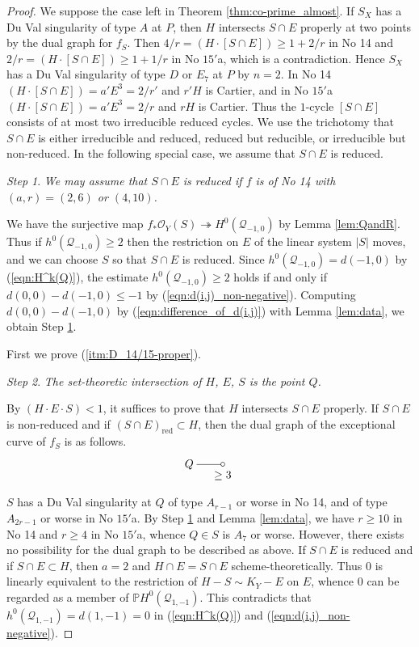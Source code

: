 \documentclass[a4paper,11pt]{amsart}
\theoremstyle{definition}
\theoremstyle{remark}
\newtheorem{step}{Step}
\numberwithin{equation}{section}
\newcommand{\bP}{{\mathbb P}}
\newcommand{\cO}{{\mathcal O}}
\newcommand{\cQ}{{\mathcal Q}}
\newcommand{\red}{\mathrm{red}}
\newcommand{\system}[1]{\left|{#1}\right|}
\begin{document}
\begin{proof}
We suppose the case left in Theorem \ref{thm:co-prime_almost}.
If $S_X$ has a Du Val singularity of type $A$ at $P$,
then $H$ intersects $S \cap E$ properly at two points
by the dual graph for $f_S$.
Then $4/r=(H \cdot [S \cap E])\ge1+2/r$ in No 14
and $2/r=(H \cdot [S \cap E])\ge1+1/r$ in No $\textrm{15}'$a,
which is a contradiction.
Hence $S_X$ has a Du Val singularity of type $D$ or $E_7$ at $P$ by $n=2$.
In No 14 $(H \cdot [S \cap E])=a'E^3=2/r'$ and $r'H$ is Cartier,
and in No $\textrm{15}'$a $(H \cdot [S \cap E])=a'E^3=2/r$ and $rH$ is Cartier.
Thus
the $1$-cycle $[S \cap E]$ consists of at most two irreducible reduced cycles.
We use the trichotomy that
$S \cap E$ is either irreducible and reduced,
reduced but reducible, or irreducible but non-reduced.
In the following special case,
we assume that $S \cap E$ is reduced.

\begin{step}\label{stp:14/15-1}
\itshape
We may assume that $S \cap E$ is reduced if
$f$ is of No 14 with $(a,r)=(2,6)$ or $(4,10)$.
\end{step}

We have the surjective map $f_*\cO_Y(S) \twoheadrightarrow H^0(\cQ_{-1,0})$
by Lemma \ref{lem:QandR}.
Thus if $h^0(\cQ_{-1,0}) \ge 2$ then
the restriction on $E$ of the linear system $\system{S}$ moves,
and we can choose $S$ so that $S \cap E$ is reduced.
Since $h^0(\cQ_{-1,0})=d(-1,0)$ by (\ref{eqn:H^k(Q)}),
the estimate $h^0(\cQ_{-1,0}) \ge 2$ holds if and only if
$d(0,0)-d(-1,0) \le -1$ by (\ref{eqn:d(i,j)_non-negative}).
Computing $d(0,0)-d(-1,0)$
by (\ref{eqn:difference_of_d(i,j)}) with Lemma \ref{lem:data},
we obtain Step \ref{stp:14/15-1}.

First we prove (\ref{itm:D_14/15-proper}).

\begin{step}\label{stp:14/15-2}
\itshape
The set-theoretic intersection of $H$, $E$, $S$ is the point $Q$.
\end{step}

By $(H \cdot E \cdot S)<1$,
it suffices to prove that $H$ intersects $S \cap E$ properly.
If $S \cap E$ is non-reduced and if $(S \cap E)_\red \subset H$,
then the dual graph of the exceptional curve of $f_S$ is as follows.
\begin{align*}
\xymatrix@!0@=30pt{
Q \ar@{-}[r]_>*+{\ \ge3} &
*=<3.5pt>{\circ}
}
\end{align*}
$S$ has a Du Val singularity at $Q$ of type $A_{r-1}$ or worse in No 14,
and of type $A_{2r-1}$ or worse in No $\textrm{15}'$a.
By Step \ref{stp:14/15-1} and Lemma \ref{lem:data},
we have $r\ge10$ in No 14 and $r\ge4$ in No $\textrm{15}'$a,
whence $Q \in S$ is $A_7$ or worse.
However,
there exists no possibility for the dual graph to be described as above.
If $S \cap E$ is reduced and if $S \cap E \subset H$,
then $a=2$ and $H \cap E=S \cap E$ scheme-theoretically.
Thus $0$ is linearly equivalent to the restriction of $H-S \sim K_Y-E$ on $E$,
whence $0$ can be regarded as a member of $\bP H^0(\cQ_{1,-1})$.
This contradicts that $h^0(\cQ_{1,-1})=d(1,-1)=0$
in (\ref{eqn:H^k(Q)}) and (\ref{eqn:d(i,j)_non-negative}).


\end{proof}
\end{document}
